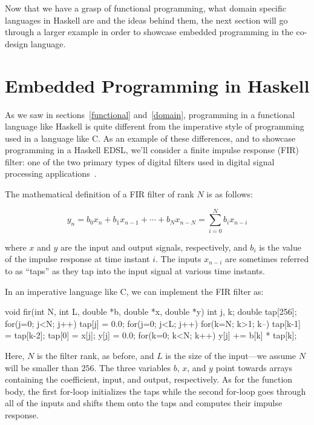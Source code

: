 \documentclass[../paper.tex]{subfiles}
\begin{document}
Now that we have a grasp of functional programming, what domain specific languages in Haskell are and the ideas behind them, the next section will go through a larger example in order to showcase embedded programming in the co-design language.

\section{Embedded Programming in Haskell}
\label{embedded}

As we saw in sections~\ref{functional} and~\ref{domain}, programming in a functional language like Haskell is quite different from the imperative style of programming used in a language like C. As an example of these differences, and to showcase programming in a Haskell EDSL, we'll consider a finite impulse response (FIR) filter: one of the two primary types of digital filters used in digital signal processing applications~\cite{oppenheim1989}.


The mathematical definition of a FIR filter of rank $N$ is as follows:

\begin{equation}
y_{n} = b_{0} x_{n} + b_{1} x_{n-1} + \cdots + b_{N} x_{n-N} = \sum_{i=0}^{N} b_{i} x_{n-i}
\end{equation}
\vspace{1mm}

\noindent where $x$ and $y$ are the input and output signals, respectively, and $b_i$ is the value of the impulse response at time instant $i$. The inputs $x_{n-i}$ are sometimes referred to as ``taps'' as they tap into the input signal at various time instants. 

In an imperative language like C, we can implement the FIR filter as:

\begin{code}
void fir(int N, int L, double *b, double *x, double *y) {
 int j, k;
 double tap[256];
 for(j=0; j<N; j++) tap[j] = 0.0;
 for(j=0; j<L; j++) {
  for(k=N; k>1; k--) tap[k-1] = tap[k-2];
  tap[0] = x[j];
  y[j] = 0.0;
  for(k=0; k<N; k++) y[j] += b[k] * tap[k];
 }
}
\end{code}

\noindent Here, $N$ is the filter rank, as before, and $L$ is the size of the input---we assume $N$ will be smaller than $256$. The three variables $b$, $x$, and $y$ point towards arrays containing the coefficient, input, and output, respectively. As for the function body, the first for-loop initializes the taps while the second for-loop goes through all of the inputs and shifts them onto the taps and computes their impulse response.
\end{document}
